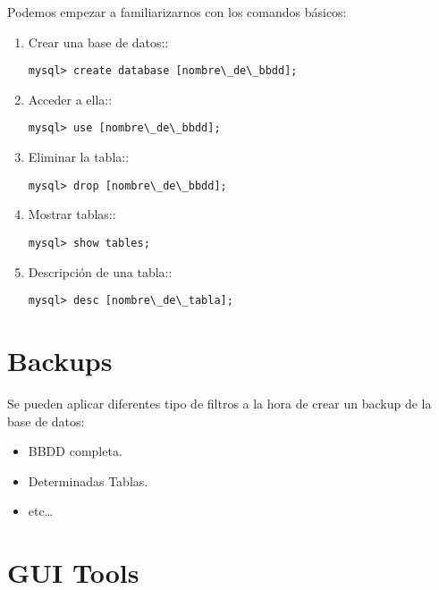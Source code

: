 \documentclass[11pt]{article}
\begin{document}
\par Podemos empezar a familiarizarnos con los comandos básicos:

\begin{enumerate}
    \item Crear una base de datos::
\begin{lstlisting}[style=Shell]
mysql> create database [nombre\_de\_bbdd];
\end{lstlisting}

    \item Acceder a ella::
\begin{lstlisting}[style=Shell]
mysql> use [nombre\_de\_bbdd];
\end{lstlisting}
    
    \item Eliminar la tabla::
\begin{lstlisting}[style=Shell]
mysql> drop [nombre\_de\_bbdd];
\end{lstlisting}
    
    \item Mostrar tablas::
\begin{lstlisting}[style=Shell]
mysql> show tables;
\end{lstlisting}

    \item Descripción de una tabla::
\begin{lstlisting}[style=Shell]
mysql> desc [nombre\_de\_tabla];
\end{lstlisting}

\end{enumerate}

\section{Backups}
\label{sec:backups}

\par Se pueden aplicar diferentes tipo de filtros a la hora de crear un backup de la base de datos:

\begin{itemize}
	\item BBDD completa.
	\item Determinadas Tablas.
	\item etc\ldots
\end{itemize}

\section{GUI Tools}
\label{sec:gui-tools}
\end{document}
